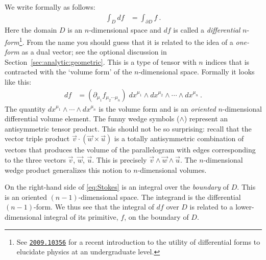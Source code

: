 \documentclass[
  11pt,
	colorful,
	raggedright,
]{tufte-style-thesis-flip}
\begin{document}
We write formally as follows:
\begin{align}
  \int_D df &= \int_{\partial D} f \ .
\end{align}
Here the domain $D$ is an $n$-dimensional space and $df$ is called a \emph{differential} $n$-\emph{form}\footnote{See \texttt{\href{https://arxiv.org/abs/2009.10356}{2009.10356}} for a recent introduction to the utility of differential forms to elucidate physics at an undergraduate level.}. From the name you should guess that it is related to the idea of a \emph{one-form} as a dual vector; see the optional discussion in Section~\ref{sec:analytic:geometric}.  This is a type of tensor with $n$ indices that is contracted with the `volume form' of the $n$-dimensional space. Formally it looks like this:
\begin{align}
  df &= (\partial_{\mu_1} f_{\mu_2\cdots \mu_n}) \; dx^{\mu_1}\wedge dx^{\mu_2}\wedge\cdots\wedge dx^{\mu_n} \ .
  \label{eq:Stokes}
\end{align}
The quantity $dx^{\mu_1}\wedge\cdots\wedge dx^{\mu_n}$ is the volume form and is an \emph{oriented} $n$-dimensional differential volume element. The funny wedge symbols ($\wedge$) represent an antisymmetric tensor product. This should not be so surprising: recall that the vector triple product $\vec{v}\cdot\left(\vec{w}\times\vec{u}\right)$ is a totally antisymmetric combination of vectors that produces the volume of the parallelogram with edges corresponding to the three vectors $\vec{v}$, $\vec{w}$, $\vec{u}$. This is precisely $\vec{v}\wedge\vec{w}\wedge\vec{u}$. The $n$-dimensional wedge product generalizes this notion to $n$-dimensional volumes. 

On the right-hand side of \eqref{eq:Stokes} is an integral over the \emph{boundary} of $D$. This is an oriented $(n-1)$-dimensional space. The integrand is the differential $(n-1)$-form. We thus see that the integral of $df$ over $D$ is related to a lower-dimensional integral of its primitive, $f$, on the boundary of $D$. 
\end{document}
